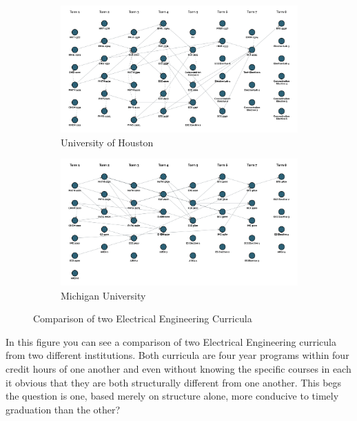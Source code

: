 \documentclass[botnum, fleqn]{unmeethesis}
\begin{document}
  \begin{figure}
    \centering
    \begin{subfigure}[h!]{.6\linewidth}
      \includegraphics[width=\linewidth]{./figures/UH.jpg}
      \caption{University of Houston}\label{fig:UH}
    \end{subfigure}

    \vspace{1cm}

    \begin{subfigure}[h!]{.6\linewidth}
      \includegraphics[width=\linewidth]{./figures/MU.jpg}
      \caption{Michigan University}\label{fig:MU}
    \end{subfigure}

    \caption{Comparison of two Electrical Engineering Curricula}
    \label{fig:comparison}
  \end{figure}

  In this figure you can see a comparison of two Electrical Engineering curricula from two different institutions. Both curricula are four year programs within four credit hours of one another and even without knowing the specific courses in each it obvious that they are both structurally different from one another. This begs the question is one, based merely on structure alone, more conducive to timely graduation than the other?
\end{document}
